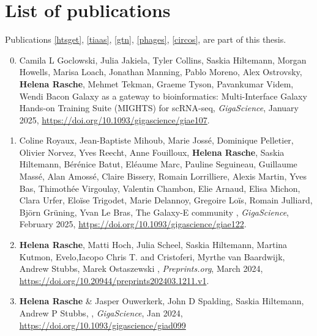 \chapter{List of publications}
\label{AppendixD}

Publications \cref{htsget}, \cref{tiaas}, \cref{gtn}, \cref{phages}, \cref{circos},  are part of this thesis.

\begin{enumerate}
\setcounter{enumi}{-1}

\item Camila L Goclowski, Julia Jakiela, Tyler Collins, Saskia Hiltemann, Morgan Howells, Marisa Loach, Jonathan Manning, Pablo Moreno, Alex Ostrovsky, \textbf{Helena Rasche}, Mehmet Tekman, Graeme Tyson, Pavankumar Videm, Wendi Bacon {\color{chaptergrey}Galaxy as a gateway to bioinformatics: Multi-Interface Galaxy Hands-on Training Suite (MIGHTS) for scRNA-seq}, \textit{GigaScience}, January 2025, \url{https://doi.org/10.1093/gigascience/giae107}.

\item Coline Royaux, Jean-Baptiste Mihoub, Marie Jossé, Dominique Pelletier, Olivier Norvez, Yves Reecht, Anne Fouilloux, \textbf{Helena Rasche}, Saskia Hiltemann, Bérénice Batut, Eléaume Marc, Pauline Seguineau, Guillaume Massé, Alan Amossé, Claire Bissery, Romain Lorrilliere, Alexis Martin, Yves Bas, Thimothée Virgoulay, Valentin Chambon, Elie Arnaud, Elisa Michon, Clara Urfer, Eloïse Trigodet, Marie Delannoy, Gregoire Loïs, Romain Julliard, Björn Grüning, Yvan Le Bras, The Galaxy-E community {\color{chaptergrey}{Guidance framework to apply best practices in ecological data analysis: Lessons learned from building Galaxy-Ecology}}, \textit{GigaScience}, February 2025, \url{https://doi.org/10.1093/gigascience/giae122}.


\item \textbf{Helena Rasche}, Matti Hoch, Julia Scheel, Saskia Hiltemann, Martina Kutmon, Evelo,Iacopo  Chris T. and Cristoferi, Myrthe van Baardwijk, Andrew Stubbs, Marek Ostaszewski {\color{chaptergrey}{Reproducible Exploration of Disease Maps with Galaxy Workflows and the MINERVA Platform}}, \textit{Preprints.org}, March 2024, \url{https://doi.org/10.20944/preprints202403.1211.v1}.

\item \textbf{Helena Rasche} \& Jasper Ouwerkerk, John D Spalding, Saskia Hiltemann, Andrew P Stubbs, {\color{chaptergrey}{FAIR data retrieval for sensitive clinical research data in Galaxy}}, \textit{GigaScience}, Jan 2024, \url{https://doi.org/10.1093/gigascience/giad099}\label{htsget}


\end{enumerate}
